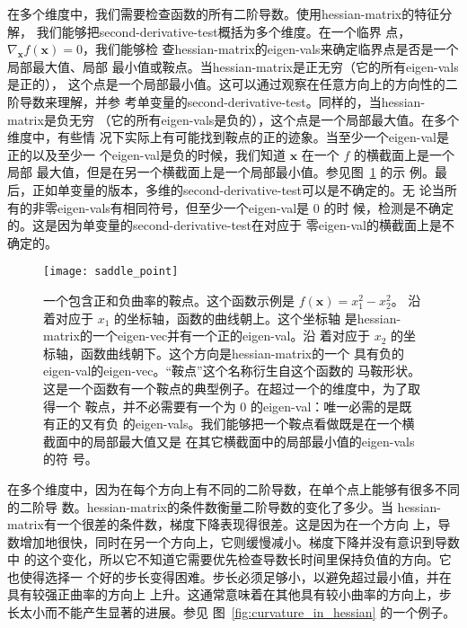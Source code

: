 在多个维度中，我们需要检查函数的所有二阶导数。使用\gls*{hessian-matrix}的特征分解，
我们能够把\gls*{second-derivative-test}概括为多个维度。在一个临界
点，$\nabla_{\pmb{x}}f(\pmb{x}) = 0$，我们能够检
查\gls*{hessian-matrix}的\gls*{eigen-vals}来确定临界点是否是一个局部最大值、局部
最小值或鞍点。当\gls*{hessian-matrix}是正无穷（它的所有\gls*{eigen-vals}是正的），
这个点是一个局部最小值。这可以通过观察在任意方向上的方向性的二阶导数来理解，并参
考单变量的\gls*{second-derivative-test}。同样的，当\gls*{hessian-matrix}是负无穷
（它的所有\gls*{eigen-vals}是负的），这个点是一个局部最大值。在多个维度中，有些情
况下实际上有可能找到鞍点的正的迹象。当至少一个\gls*{eigen-val}是正的以及至少一
个\gls*{eigen-val}是负的时候，我们知道 $\pmb{x}$ 在一个 $f$ 的横截面上是一个局部
最大值，但是在另一个横截面上是一个局部最小值。参见图~\ref{fig:saddle_point} 的示
例。最后，正如单变量的版本，多维的\gls*{second-derivative-test}可以是不确定的。无
论当所有的非零\gls*{eigen-vals}有相同符号，但至少一个\gls*{eigen-val}是 $0$ 的时
候，检测是不确定的。这是因为单变量的\gls*{second-derivative-test}在对应于
零\gls*{eigen-val}的横截面上是不确定的。

\begin{figure}[h]
  \centering
  \texttt{[image: saddle\_point]}
  \caption{一个包含正和负曲率的鞍点。这个函数示例是 $f(\pmb{x}) = x^2_1 - x^2_2$。
    沿着对应于 $x_1$ 的坐标轴，函数的曲线朝上。这个坐标轴
    是\gls*{hessian-matrix}的一个\gls*{eigen-vec}并有一个正的\gls*{eigen-val}。沿
    着对应于 $x_2$ 的坐标轴，函数曲线朝下。这个方向是\gls*{hessian-matrix}的一个
    具有负的\gls*{eigen-val}的\gls*{eigen-vec}。``鞍点''这个名称衍生自这个函数的
    马鞍形状。这是一个函数有一个鞍点的典型例子。在超过一个的维度中，为了取得一个
    鞍点，并不必需要有一个为 $0$ 的\gls*{eigen-val}：唯一必需的是既有正的又有负
    的\gls*{eigen-vals}。我们能够把一个鞍点看做既是在一个横截面中的局部最大值又是
    在其它横截面中的局部最小值的\gls*{eigen-vals}的符
    号。\label{fig:saddle_point}}
\end{figure}

在多个维度中，因为在每个方向上有不同的二阶导数，在单个点上能够有很多不同的二阶导
数。\gls*{hessian-matrix}的条件数衡量二阶导数的变化了多少。当
\gls*{hessian-matrix}有一个很差的条件数，梯度下降表现得很差。这是因为在一个方向
上，导数增加地很快，同时在另一个方向上，它则缓慢减小。梯度下降并没有意识到导数中
的这个变化，所以它不知道它需要优先检查导数长时间里保持负值的方向。它也使得选择一
个好的步长变得困难。步长必须足够小，以避免超过最小值，并在具有较强正曲率的方向上
上升。这通常意味着在其他具有较小曲率的方向上，步长太小而不能产生显著的进展。参见
图~\ref{fig:curvature_in_hessian} 的一个例子。

